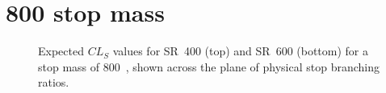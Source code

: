 \FloatBarrier

\newpage
\section{800 \texorpdfstring{\GeV}{GeV} stop mass}

\begin{figure}[ht]
  \centering
  \caption{
    Expected
    $CL_S$ values for SR~400 (top) and SR~600 (bottom) for a stop mass of
    800~\GeV,
    shown across the plane of physical stop branching ratios.
  }
\end{figure}

